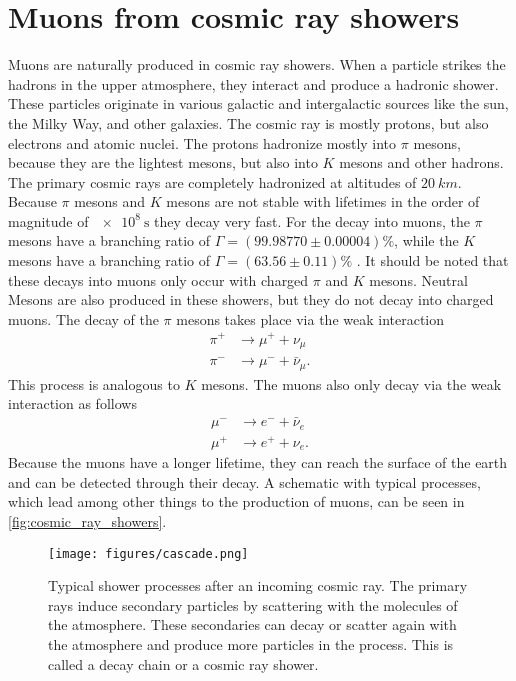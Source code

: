 \section{Muons from cosmic ray showers} 
Muons are naturally produced in cosmic ray showers. When a particle strikes the 
hadrons in the upper atmosphere, they interact and produce a hadronic shower. These particles originate 
in various galactic and intergalactic sources like the sun, the Milky Way, and other galaxies. The cosmic 
ray is mostly protons, but also electrons and atomic nuclei. The protons 
hadronize mostly into $\pi$ mesons, because they are the lightest mesons, but also into $K$ mesons 
and other hadrons.
The primary cosmic rays are completely hadronized at altitudes of $\SI{20}{km}$. Because $\pi$ mesons and $K$ mesons are not stable with lifetimes in the order of 
magnitude of $\SI{e8}{\second}$ they decay very fast. For the decay into muons, the $\pi$ mesons have a branching ratio
of $\Gamma = (99.98770\pm{0.00004})\%$, while the $K$ mesons have a branching ratio of $\Gamma = (63.56\pm{0.11})\%$ \cite{pdg}. 
It should be noted that these decays into muons only occur with charged $\pi$ and $K$ mesons. Neutral 
Mesons are also produced in these showers, but they do not decay into charged muons. The decay of the $\pi$ mesons 
takes place via the weak interaction 
\begin{align*}
    \pi^{+} &\to \mu^{+} + \nu_{\mu} \\
    \pi^{-} &\to \mu^{-} + \bar{\nu}_{\mu}.
\end{align*}
This process is analogous to $K$ mesons. The muons also only decay via the weak interaction as follows 
\begin{align*}
    \mu^{-} &\to e^{-} + \bar{\nu}_{e} \\
    \mu^{+} &\to e^{+} + \nu_{e}.
\end{align*}
Because the muons have a longer lifetime, they can reach the surface of the earth and can be detected through their decay. 
A schematic with typical processes, which lead among other things to the production of muons, can be seen in \autoref{fig:cosmic_ray_showers}.
\begin{figure}
    \centering
    \texttt{[image: figures/cascade.png]}
    \caption{Typical shower processes after an incoming cosmic ray. The primary rays induce secondary particles by scattering with the 
    molecules of the atmosphere. These secondaries can decay or scatter again with the atmosphere and produce more particles in the process. 
    This is called a decay chain or a cosmic ray shower\cite{nasa}.}
    \label{fig:cosmic_ray_showers}
\end{figure}
